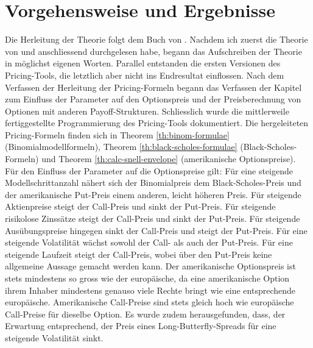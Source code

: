 \documentclass[11pt]{report} %
\begin{document}
\section{Vorgehensweise und Ergebnisse}
Die Herleitung der Theorie folgt dem Buch von \textcite{Roman2012-sk}. Nachdem ich zuerst die Theorie von \textcite{Adelmeyer2003} und anschliessend \textcite{Roman2012-sk} durchgelesen habe, begann das Aufschreiben der Theorie in möglichst eigenen Worten. Parallel entstanden die ersten Versionen des Pricing-Tools, die letztlich aber nicht ins Endresultat einflossen. Nach dem Verfassen der Herleitung der Pricing-Formeln begann das Verfassen der Kapitel zum Einfluss der Parameter auf den Optionspreis und der Preisberechnung von Optionen mit anderen Payoff-Strukturen. Schliesslich wurde die mittlerweile fertiggestellte Programmierung des Pricing-Tools dokumentiert. Die hergeleiteten Pricing-Formeln finden sich in Theorem \ref{th:binom-formulae} (Binomialmodellformeln), Theorem \ref{th:black-scholes-formulae} (Black-Scholes-Formeln) und Theorem \ref{th:calc-snell-envelope} (amerikanische Optionspreise). Für den Einfluss der Parameter auf die Optionspreise gilt: Für eine steigende Modellschrittanzahl nähert sich der Binomialpreis dem Black-Scholes-Preis und der amerikanische Put-Preis einem anderen, leicht höheren Preis. Für steigende Aktienpreise steigt der Call-Preis und sinkt der Put-Preis. Für steigende risikolose Zinssätze steigt der Call-Preis und sinkt der Put-Preis. Für steigende Ausübungspreise hingegen sinkt der Call-Preis und steigt der Put-Preis. Für eine steigende Volatilität wächst sowohl der Call- als auch der Put-Preis. Für eine steigende Laufzeit steigt der Call-Preis, wobei über den Put-Preis keine allgemeine Aussage gemacht werden kann. Der amerikanische Optionspreis ist stets mindestens so gross wie der europäische, da eine amerikanische Option ihrem Inhaber mindestens genauso viele Rechte bringt wie eine entsprechende europäische. Amerikanische Call-Preise sind stets gleich hoch wie europäische Call-Preise für dieselbe Option. Es wurde zudem herausgefunden, dass, der Erwartung entsprechend, der Preis eines Long-Butterfly-Spreads für eine steigende Volatilität sinkt. 
\end{document}
